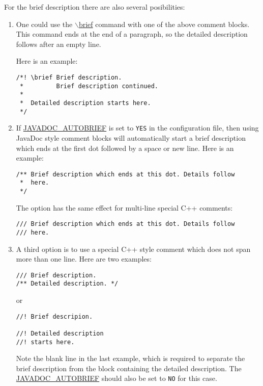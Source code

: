 For the brief description there are also several posibilities: \begin{enumerate}
\item One could use the \hyperlink{commands_cmdbrief}{$\backslash$brief} command with one of the above comment blocks. This command ends at the end of a paragraph, so the detailed description follows after an empty line.

Here is an example:



\footnotesize\begin{verbatim}
/*! \brief Brief description.
 *         Brief description continued.
 *
 *  Detailed description starts here.
 */
\end{verbatim}
\normalsize


\item If \hyperlink{config_cfg_javadoc_autobrief}{JAVADOC\_\-AUTOBRIEF} is set to {\tt YES} in the configuration file, then using JavaDoc style comment blocks will automatically start a brief description which ends at the first dot followed by a space or new line. Here is an example:



\footnotesize\begin{verbatim}
/** Brief description which ends at this dot. Details follow
 *  here.
 */
\end{verbatim}
\normalsize
 The option has the same effect for multi-line special C++ comments: 

\footnotesize\begin{verbatim}
/// Brief description which ends at this dot. Details follow
/// here.
\end{verbatim}
\normalsize


\item A third option is to use a special C++ style comment which does not span more than one line. Here are two examples: 

\footnotesize\begin{verbatim}
/// Brief description.
/** Detailed description. */
\end{verbatim}
\normalsize


or



\footnotesize\begin{verbatim}
//! Brief descripion.

//! Detailed description 
//! starts here.
\end{verbatim}
\normalsize


Note the blank line in the last example, which is required to separate the brief description from the block containing the detailed description. The \hyperlink{config_cfg_javadoc_autobrief}{JAVADOC\_\-AUTOBRIEF} should also be set to {\tt NO} for this case.

\end{enumerate}


